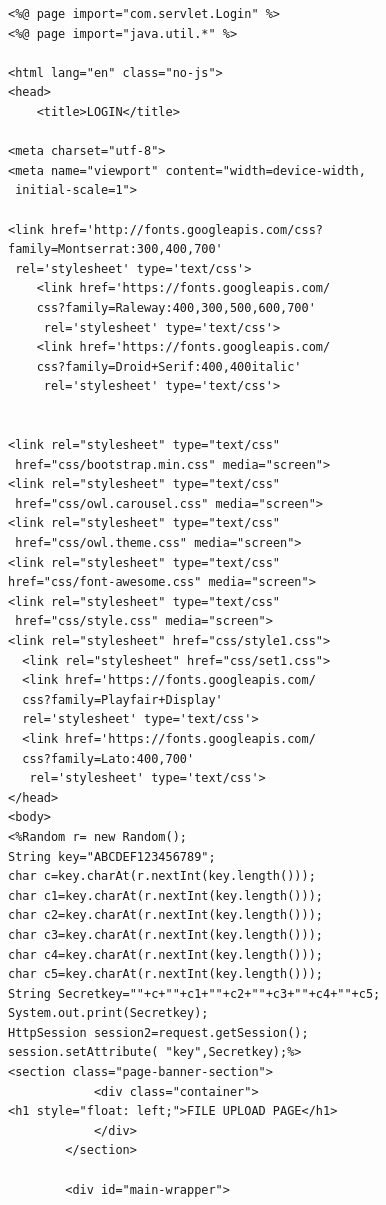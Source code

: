 \documentclass[BTech]{srmuthesis}
\begin{document}
\begin{verbatim}
<%@ page import="com.servlet.Login" %>
<%@ page import="java.util.*" %>

<html lang="en" class="no-js">
<head>
	<title>LOGIN</title>

<meta charset="utf-8">
<meta name="viewport" content="width=device-width,
 initial-scale=1">

<link href='http://fonts.googleapis.com/css?
family=Montserrat:300,400,700'
 rel='stylesheet' type='text/css'>
	<link href='https://fonts.googleapis.com/
	css?family=Raleway:400,300,500,600,700'
	 rel='stylesheet' type='text/css'>
	<link href='https://fonts.googleapis.com/
	css?family=Droid+Serif:400,400italic'
	 rel='stylesheet' type='text/css'>
	
	
<link rel="stylesheet" type="text/css"
 href="css/bootstrap.min.css" media="screen">	
<link rel="stylesheet" type="text/css"
 href="css/owl.carousel.css" media="screen">
<link rel="stylesheet" type="text/css"
 href="css/owl.theme.css" media="screen">
<link rel="stylesheet" type="text/css" 
href="css/font-awesome.css" media="screen">
<link rel="stylesheet" type="text/css"
 href="css/style.css" media="screen">
<link rel="stylesheet" href="css/style1.css">
  <link rel="stylesheet" href="css/set1.css">
  <link href='https://fonts.googleapis.com/
  css?family=Playfair+Display' 
  rel='stylesheet' type='text/css'>
  <link href='https://fonts.googleapis.com/
  css?family=Lato:400,700'
   rel='stylesheet' type='text/css'>
</head>
<body>
<%Random r= new Random(); 
String key="ABCDEF123456789";
char c=key.charAt(r.nextInt(key.length()));
char c1=key.charAt(r.nextInt(key.length()));
char c2=key.charAt(r.nextInt(key.length()));
char c3=key.charAt(r.nextInt(key.length()));
char c4=key.charAt(r.nextInt(key.length()));
char c5=key.charAt(r.nextInt(key.length()));
String Secretkey=""+c+""+c1+""+c2+""+c3+""+c4+""+c5;
System.out.print(Secretkey);
HttpSession session2=request.getSession();
session.setAttribute( "key",Secretkey);%>
<section class="page-banner-section">
			<div class="container">
<h1 style="float: left;">FILE UPLOAD PAGE</h1>
			</div>
		</section>
		
		<div id="main-wrapper">


\end{verbatim}
\end{document}
